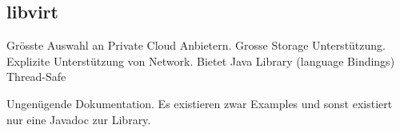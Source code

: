 \subsection{libvirt}
\begin{Argumentation}
\pro Grösste Auswahl an Private Cloud Anbietern.
\pro Grosse Storage Unterstützung.
\pro Explizite Unterstützung von Network.
\pro Bietet Java Library (language Bindings)
\pro Thread-Safe

\contra Ungenügende Dokumentation. Es existieren zwar Examples und 
sonst existiert nur eine Javadoc zur Library.
\end{Argumentation}









